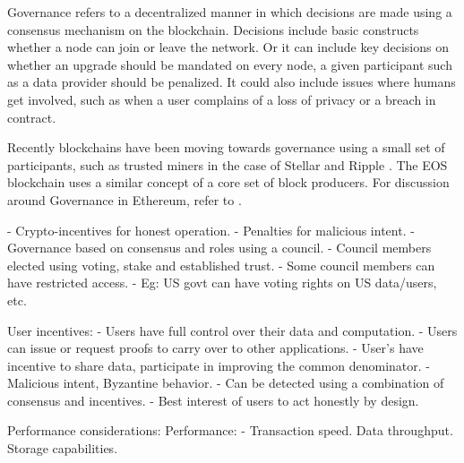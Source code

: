 Governance refers to a decentralized manner in which decisions are made using a consensus mechanism on the blockchain.
Decisions include basic constructs whether a node can join or leave the network. Or it can include key decisions on
whether an upgrade should be mandated on every node, a given participant such as a data provider should be penalized. It
could also include issues where humans get involved, such as when a user complains of a loss of privacy or a breach in
contract.

Recently blockchains have been moving towards governance using a small set of participants, such as trusted miners in
the case of Stellar and Ripple \cite{stellar_gateways}. The EOS blockchain uses a similar concept of a core set of block
producers. For discussion around Governance in Ethereum, refer to \cite{buterin_gov}.

 - Crypto-incentives for honest operation.
 - Penalties for malicious intent.
 - Governance based on consensus and roles using a council.
 - Council members elected using voting, stake and established trust.
 - Some council members can have restricted access.
 - Eg: US govt can have voting rights on US data/users, etc.

User incentives:
 - Users have full control over their data and computation.
 - Users can issue or request proofs to carry over to other applications.
 - User’s have incentive to share data, participate in improving the common denominator.
 - Malicious intent, Byzantine behavior.
   - Can be detected using a combination of consensus and incentives.
   - Best interest of users to act honestly by design.


\noindent
{\textsf Performance considerations:}
Performance:
- Transaction speed. Data throughput. Storage capabilities.
